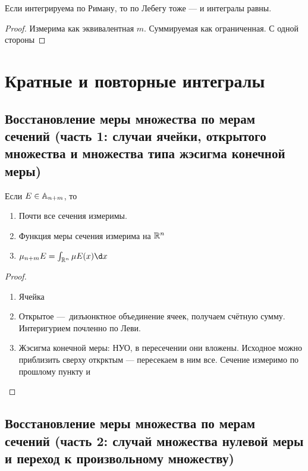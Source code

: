 \documentclass[12pt, a4paper, oneside]{memoir}
\begin{document}
\begin{theorem}

    Если интегрируема по Риману, то по Лебегу тоже — и интегралы равны.

    \begin{proof}
        Измерима как эквивалентная $m$. Суммируемая как ограниченная. С одной стороны
    \end{proof}
\end{theorem}



\section{Кратные и повторные интегралы}

\subsection{Восстановление меры множества по мерам сечений
(часть 1: случаи ячейки, открытого множества и множества типа жэсигма конечной меры)}

\begin{theorem}

    Если $E \in {\mathbb{A}}_{n + m}$, то

    \begin{enumerate}
        \item Почти все сечения измеримы.
        \item Функция меры сечения измерима на ${\mathbb{R}}^n$
        \item $\mu_{n + m} E = \int_{\sR^n} \mu E(x) \d x$
    \end{enumerate}
\end{theorem}

\begin{proof}
    \begin{enumerate}
        \item Ячейка
        \item Открытое — дизъюнктное объединение ячеек, получаем счётную сумму. Интеригурием почленно по Леви.
        \item Жэсигма конечной меры:
        НУО, в пересечении они вложены. Исходное можно приблизить сверху открктым — пересекаем в ним все. Сечение измеримо по прошлому пункту и 
    \end{enumerate}
\end{proof}

\subsection{Восстановление меры множества по мерам сечений
(часть 2: случай множества нулевой меры и переход к произвольному множеству)}
\end{document}
